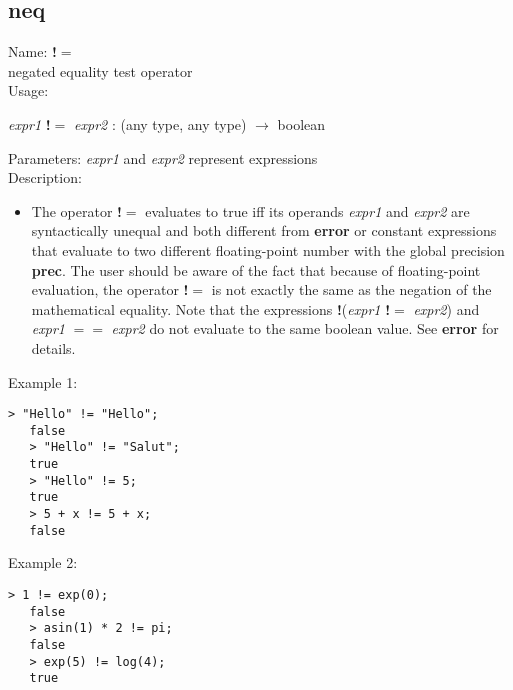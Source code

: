 \subsection{ neq }
\noindent Name: \textbf{!$=$}\\
negated equality test operator\\

\noindent Usage: 
\begin{center}
\emph{expr1} \textbf{!$=$} \emph{expr2} : (\textsf{any type}, \textsf{any type}) $\rightarrow$ \textsf{boolean}\\
\end{center}
Parameters: 
\emph{expr1} and \emph{expr2} represent expressions\\

\noindent Description: \begin{itemize}

\item The operator \textbf{!$=$} evaluates to true iff its operands \emph{expr1} and
   \emph{expr2} are syntactically unequal and both different from \textbf{error} or
   constant expressions that evaluate to two different floating-point
   number with the global precision \textbf{prec}. The user should be aware of
   the fact that because of floating-point evaluation, the operator
   \textbf{!$=$} is not exactly the same as the negation of the mathematical
   equality. 
   Note that the expressions \textbf{!}(\emph{expr1} \textbf{!$=$} \emph{expr2}) and \emph{expr1} \textbf{$==$}
   \emph{expr2} do not evaluate to the same boolean value. See \textbf{error} for
   details.
\end{itemize}
\noindent Example 1: 
\begin{center}\begin{minipage}{14.8cm}\begin{Verbatim}[frame=single]
   > "Hello" != "Hello";
   false
   > "Hello" != "Salut";
   true
   > "Hello" != 5;
   true
   > 5 + x != 5 + x;
   false
\end{Verbatim}
\end{minipage}\end{center}
\noindent Example 2: 
\begin{center}\begin{minipage}{14.8cm}\begin{Verbatim}[frame=single]
   > 1 != exp(0);
   false
   > asin(1) * 2 != pi;
   false
   > exp(5) != log(4);
   true
\end{Verbatim}
\end{minipage}\end{center}
